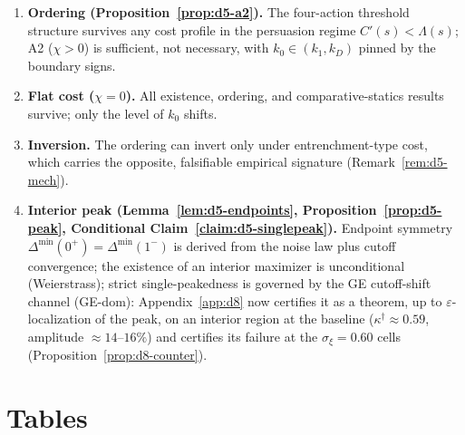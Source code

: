 \documentclass[11pt]{article}
\newcommand{\1}{\mathbf{1}}
\begin{document}
\begin{enumerate}
\item \textbf{Ordering (Proposition~\ref{prop:d5-a2}).} The four-action threshold structure survives any cost profile in the persuasion regime $C'(s)<\Lambda(s)$; A2 ($\chi>0$) is sufficient, not necessary, with $k_0\in(k_1,k_D)$ pinned by the boundary signs.
\item \textbf{Flat cost ($\chi=0$).} All existence, ordering, and comparative-statics results survive; only the level of $k_0$ shifts.
\item \textbf{Inversion.} The ordering can invert only under entrenchment-type cost, which carries the opposite, falsifiable empirical signature (Remark~\ref{rem:d5-mech}).
\item \textbf{Interior peak (Lemma~\ref{lem:d5-endpoints}, Proposition~\ref{prop:d5-peak}, Conditional Claim~\ref{claim:d5-singlepeak}).} Endpoint symmetry $\Delta^{\min}(0^+)=\Delta^{\min}(1^-)$ is derived from the noise law plus cutoff convergence; the existence of an interior maximizer is unconditional (Weierstrass); strict single-peakedness is governed by the GE cutoff-shift channel (GE-dom): Appendix~\ref{app:d8} now certifies it as a theorem, up to $\varepsilon$-localization of the peak, on an interior region at the baseline ($\kappa^{\dagger}\approx0.59$, amplitude $\approx14$--$16\%$) and certifies its failure at the $\sigma_\xi=0.60$ cells (Proposition~\ref{prop:d8-counter}).
\end{enumerate}



\section{Tables}
\label{app:tables}


\setcounter{table}{0}
\renewcommand{\thetable}{\thesection.\arabic{table}}

\begin{table}[H]
\centering

\caption{Baseline numerical equilibrium (values rounded to two decimals). Parameters: $\mu=1$, $\sigma_v=0.5$, $\sigma_\varepsilon=0.5$, $\delta=0.95$, $\Delta=0.25$, $C_0=0.12$, $\chi=0.5$, $\kappa=0.5$, $m_0=0.10$, $m_1=0.30$, $\bar{S}=1.44$, $K=0.15$, $\sigma_\xi=0.40$, $\rho=0.9$. Cutoffs: $k_1=k_0\approx0.82$ and $k_D\approx2.26$.}
\label{tab:example}
\end{table}
\end{document}
